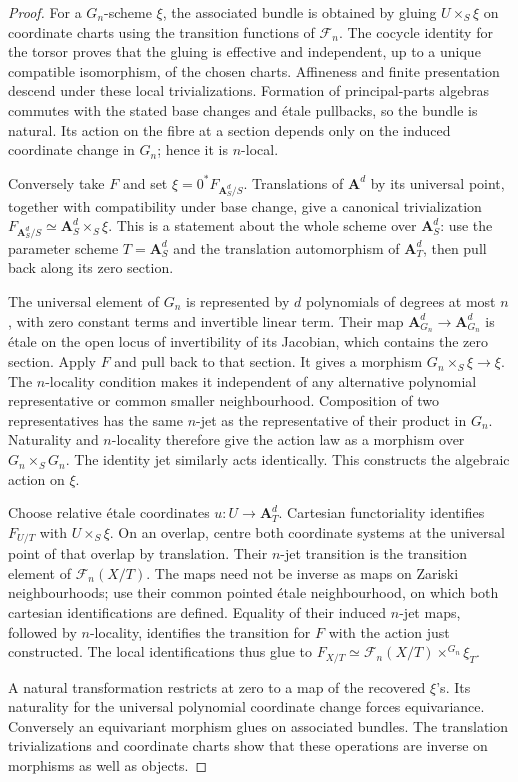 \begin{proof}
For a $G_n$-scheme $\xi$, the associated bundle is obtained by gluing
$U\times_S\xi$ on coordinate charts using the transition functions of
$\mathcal F_n$. The cocycle identity for the torsor proves that the gluing
is effective and independent, up to a unique compatible isomorphism, of the
chosen charts. Affineness and finite presentation descend under these local
trivializations. Formation of principal-parts algebras commutes with the
stated base changes and \'{e}tale pullbacks, so the bundle is natural.
Its action on the fibre at a section depends only on the induced coordinate
change in $G_n$; hence it is $n$-local.

Conversely take $F$ and set $\xi=0^*F_{\mathbf A^d_S/S}$. Translations of
$\mathbf A^d$ by its universal point, together with compatibility under
base change, give a canonical trivialization
$F_{\mathbf A^d_S/S}\simeq\mathbf A^d_S\times_S\xi$. This is a statement
about the whole scheme over $\mathbf A^d_S$: use the parameter scheme
$T=\mathbf A^d_S$ and the translation automorphism of $\mathbf A^d_T$,
then pull back along its zero section.

The universal element of $G_n$ is represented by $d$ polynomials of degrees
at most $n$, with zero constant terms and invertible linear term. Their map
$\mathbf A^d_{G_n}\to\mathbf A^d_{G_n}$ is \'{e}tale on the open locus of
invertibility of its Jacobian, which contains the zero section. Apply $F$
and pull back to that section. It gives a morphism
$G_n\times_S\xi\to\xi$. The $n$-locality condition makes it independent
of any alternative polynomial representative or common smaller
neighbourhood. Composition of two representatives has the same $n$-jet as
the representative of their product in $G_n$. Naturality and $n$-locality
therefore give the action law as a morphism over $G_n\times_S G_n$.
The identity jet similarly acts identically. This constructs the algebraic
action on $\xi$.

Choose relative \'{e}tale coordinates $u:U\to\mathbf A^d_T$. Cartesian
functoriality identifies $F_{U/T}$ with $U\times_S\xi$. On an overlap,
centre both coordinate systems at the universal point of that overlap by
translation. Their $n$-jet transition is the transition element of
$\mathcal F_n(X/T)$. The maps need not be inverse as maps on Zariski
neighbourhoods; use their common pointed \'{e}tale neighbourhood, on which
both cartesian identifications are defined. Equality of their induced
$n$-jet maps, followed by $n$-locality, identifies the transition for $F$
with the action just constructed. The local identifications thus glue to
$F_{X/T}\simeq\mathcal F_n(X/T)\times^{G_n}\xi_T$.

A natural transformation restricts at zero to a map of the recovered
$\xi$'s. Its naturality for the universal polynomial coordinate change
forces equivariance. Conversely an equivariant morphism glues on associated
bundles. The translation trivializations and coordinate charts show that
these operations are inverse on morphisms as well as objects.
\end{proof}

